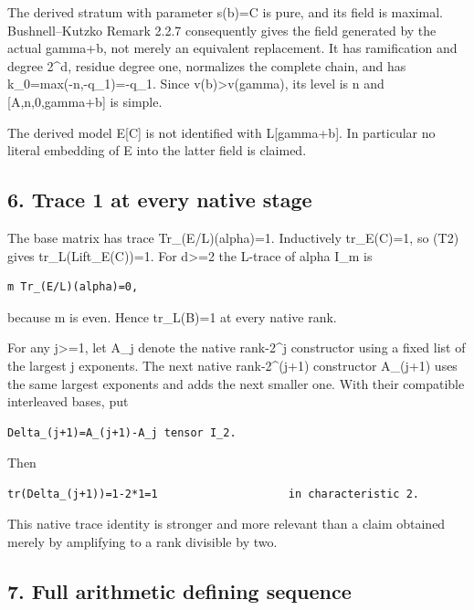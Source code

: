 The derived stratum with parameter s(b)=C is pure, and its field is
maximal. Bushnell--Kutzko Remark 2.2.7 consequently gives the field
generated by the actual gamma+b, not merely an equivalent replacement.
It has ramification and degree 2\^{}d, residue degree one, normalizes
the complete chain, and has k\_0=max(-n,-q\_1)=-q\_1. Since
v(b)\textgreater v(gamma), its level is n and {[}A,n,0,gamma+b{]} is
simple.

The derived model E{[}C{]} is not identified with L{[}gamma+b{]}. In
particular no literal embedding of E into the latter field is claimed.

\hypertarget{dyadic_tower-trace-1-at-every-native-stage}{%
\subsection{6. Trace 1 at every native
stage}\label{dyadic_tower-trace-1-at-every-native-stage}}

The base matrix has trace Tr\_(E/L)(alpha)=1. Inductively tr\_E(C)=1, so
(T2) gives tr\_L(Lift\_E(C))=1. For d\textgreater=2 the L-trace of alpha
I\_m is

\begin{Verbatim}[fontsize=\small,breaklines=true,breakanywhere=true]
m Tr_(E/L)(alpha)=0,
\end{Verbatim}

because m is even. Hence tr\_L(B)=1 at every native rank.

For any j\textgreater=1, let A\_j denote the native rank-2\^{}j
constructor using a fixed list of the largest j exponents. The next
native rank-2\^{}(j+1) constructor A\_(j+1) uses the same largest
exponents and adds the next smaller one. With their compatible
interleaved bases, put

\begin{Verbatim}[fontsize=\small,breaklines=true,breakanywhere=true]
Delta_(j+1)=A_(j+1)-A_j tensor I_2.
\end{Verbatim}

Then

\begin{Verbatim}[fontsize=\small,breaklines=true,breakanywhere=true]
tr(Delta_(j+1))=1-2*1=1                    in characteristic 2.
\end{Verbatim}

This native trace identity is stronger and more relevant than a claim
obtained merely by amplifying to a rank divisible by two.

\hypertarget{dyadic_tower-full-arithmetic-defining-sequence}{%
\subsection{7. Full arithmetic defining
sequence}\label{dyadic_tower-full-arithmetic-defining-sequence}}

